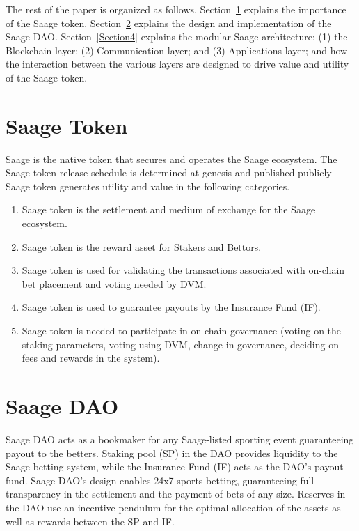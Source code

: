\documentclass[%
 reprint,
 amsmath,amssymb,
 aps,
]{revtex4-2}
\begin{document}
The rest of the paper is organized as follows. Section~\ref{Section2} explains the importance of the Saage token. Section~\ref{Section3} explains the design and implementation of the Saage DAO. Section~\ref{Section4} explains the modular Saage architecture: (1) the Blockchain layer; (2) Communication layer; and (3) Applications layer; and how the interaction between the various layers are designed to drive value and utility of the Saage token. 

\section{Saage Token}\label{Section2}
Saage is the native token that secures and operates the Saage ecosystem. The Saage token release schedule is determined at genesis and published publicly
Saage token generates utility and value in the following categories.

\begin{enumerate}
\item Saage token is the settlement and medium of exchange for the Saage ecosystem.
\item Saage token is the reward asset for Stakers and Bettors.  
\item Saage token is used for validating the transactions associated with on-chain bet placement and voting needed by DVM. 
\item Saage token is used to guarantee payouts by the Insurance Fund (IF). 
\item Saage token is needed to participate in on-chain governance (voting on the staking parameters, voting using DVM, change in governance, deciding on fees and rewards in the system). 
\end{enumerate}

\section{Saage DAO} \label{Section3}

Saage DAO acts as a bookmaker for any Saage-listed sporting event guaranteeing payout to the betters. Staking pool (SP) in the DAO provides liquidity to the Saage betting system, while the Insurance Fund (IF) acts as the DAO’s payout fund.   Saage DAO’s design enables 24x7 sports betting, guaranteeing full transparency in the settlement and the payment of bets of any size. Reserves in the DAO use an incentive pendulum for the optimal allocation of the assets as well as rewards between the SP and IF. 
\end{document}
